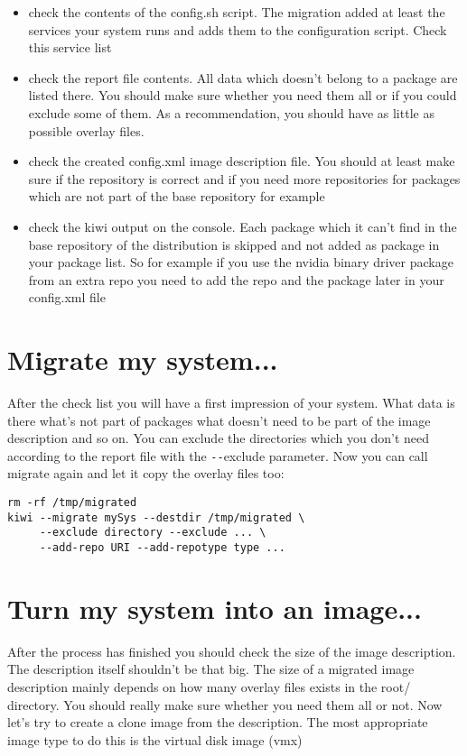 \begin{itemize}
\item check the contents of the config.sh script. The migration
      added at least the services your system runs and adds them
      to the configuration script. Check this service list
\item check the report file contents. All data which doesn't belong
      to a package are listed there. You should make sure whether you
      need them all or if you could exclude some of them. As a
      recommendation, you should have as little as possible overlay
      files.
\item check the created config.xml image description file. You should
      at least make sure if the repository is correct and if you need
      more repositories for packages which are not part of the base
      repository for example
\item check the kiwi output on the console. Each package which it can't
      find in the base repository of the distribution is skipped and
      not added as package in your package list. So for example if you
      use the nvidia binary driver package from an extra repo you need
      to add the repo and the package later in your config.xml file
\end{itemize}

\section{Migrate my system...}
After the check list you will have a first impression of your system.
What data is there what's not part of packages what doesn't need to
be part of the image description and so on. You can exclude the
directories which you don't need according to the report file with
the \verb+--+exclude parameter. Now you can call migrate again and let
it copy the overlay files too:

\begin{Command}{12cm}
\begin{verbatim}
rm -rf /tmp/migrated
kiwi --migrate mySys --destdir /tmp/migrated \
     --exclude directory --exclude ... \
     --add-repo URI --add-repotype type ...
\end{verbatim}
\end{Command}

\section{Turn my system into an image...}
After the process has finished you should check the size of the
image description. The description itself shouldn't be that big.
The size of a migrated image description mainly depends on how many
overlay files exists in the root/ directory. You should really make
sure whether you need them all or not. Now let's try to create a
clone image from the description. The most appropriate image type
to do this is the virtual disk image (vmx)

